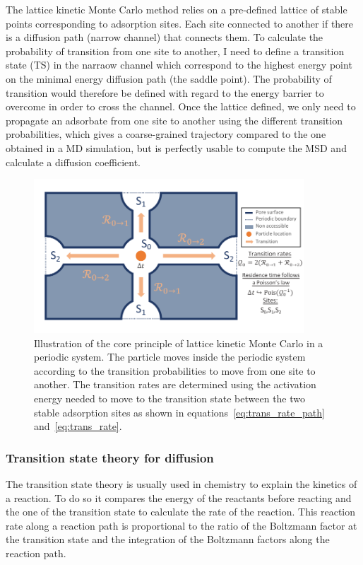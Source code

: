 \documentclass[main]{subfiles}
\begin{document}
The lattice kinetic Monte Carlo method relies on a pre-defined lattice of stable points corresponding to adsorption sites. Each site connected to another if there is a diffusion path (narrow channel) that connects them. To calculate the probability of transition from one site to another, I need to define a transition state (TS) in the narraow channel which correspond to the highest energy point on the minimal energy diffusion path (the saddle point). The probability of transition would therefore be defined with regard to the energy barrier to overcome in order to cross the channel. Once the lattice defined, we only need to propagate an adsorbate from one site to another using the different transition probabilities, which gives a coarse-grained trajectory compared to the one obtained in a MD simulation, but is perfectly usable to compute the MSD and calculate a diffusion coefficient.


\begin{figure}[ht]
  \centering
    \includegraphics[width=0.9\textwidth]{figures/5-diffusion/kinetic_MC.pdf}
    \caption{Illustration of the core principle of lattice kinetic Monte Carlo in a periodic system. The particle moves inside the periodic system according to the transition probabilities to move from one site to another. The transition rates are determined using the activation energy needed to move to the transition state between the two stable adsorption sites as shown in equations~\ref{eq:trans_rate_path} and~\ref{eq:trans_rate}. }\label{fgr:kMC_principle}
\end{figure}

\subsubsection{Transition state theory for diffusion}

The transition state theory is usually used in chemistry to explain the kinetics of a reaction. To do so it compares the energy of the reactants before reacting and the one of the transition state to calculate the rate of the reaction. This reaction rate along a reaction path is proportional to the ratio of the Boltzmann factor at the transition state and the integration of the Boltzmann factors along the reaction path.
\end{document}
